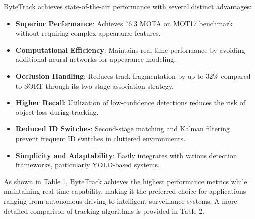 \documentclass[11pt]{article}
\begin{document}
ByteTrack achieves state-of-the-art performance with several distinct advantages:

\begin{itemize}
    \item \textbf{Superior Performance}: Achieves 76.3 MOTA on MOT17 benchmark without requiring complex appearance features.
    
    \item \textbf{Computational Efficiency}: Maintains real-time performance by avoiding additional neural networks for appearance modeling.
    
    \item \textbf{Occlusion Handling}: Reduces track fragmentation by up to 32\% compared to SORT through its two-stage association strategy.
    
    \item \textbf{Higher Recall}: Utilization of low-confidence detections reduces the risk of object loss during tracking.
    
    \item \textbf{Reduced ID Switches}: Second-stage matching and Kalman filtering prevent frequent ID switches in cluttered environments.
    
    \item \textbf{Simplicity and Adaptability}: Easily integrates with various detection frameworks, particularly YOLO-based systems.
\end{itemize}

As shown in Table 1, ByteTrack achieves the highest performance metrics while maintaining real-time capability, making it the preferred choice for applications ranging from autonomous driving to intelligent surveillance systems. A more detailed comparison of tracking algorithms is provided in Table 2.


\end{document}
